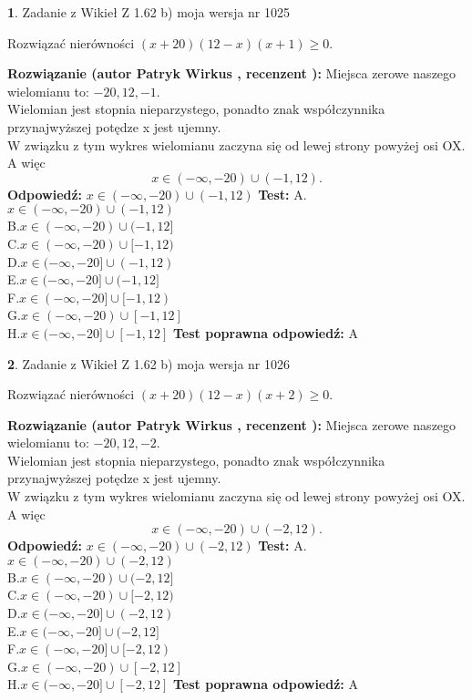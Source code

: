 \documentclass[12pt, a4paper]{article}
\theoremstyle{definition} %
\newtheorem{zad}{}
\newcommand{\zadStart}[1]{\begin{zad}#1\newline}
\newcommand{\zadStop}{\end{zad}}
\newcommand{\rozwStart}[2]{\noindent \textbf{Rozwiązanie (autor #1 , recenzent #2): }\newline}
\newcommand{\rozwStop}{\newline}
\newcommand{\odpStart}{\noindent \textbf{Odpowiedź:}\newline}
\newcommand{\odpStop}{\newline}
\newcommand{\testStart}{\noindent \textbf{Test:}\newline}
\newcommand{\testStop}{\newline}
\newcommand{\kluczStart}{\noindent \textbf{Test poprawna odpowiedź:}\newline}
\newcommand{\kluczStop}{\newline}
\begin{document}
\zadStart{Zadanie z Wikieł Z 1.62 b) moja wersja nr 1025}

Rozwiązać nierówności $(x+20)(12-x)(x+1)\ge0$.
\zadStop
\rozwStart{Patryk Wirkus}{}
Miejsca zerowe naszego wielomianu to: $-20, 12, -1$.\\
Wielomian jest stopnia nieparzystego, ponadto znak współczynnika przy\linebreak najwyższej potędze x jest ujemny.\\ W związku z tym wykres wielomianu zaczyna się od lewej strony powyżej osi OX. A więc $$x \in (-\infty,-20) \cup (-1,12).$$
\rozwStop
\odpStart
$x \in (-\infty,-20) \cup (-1,12)$
\odpStop
\testStart
A.$x \in (-\infty,-20) \cup (-1,12)$\\
B.$x \in (-\infty,-20) \cup (-1,12]$\\
C.$x \in (-\infty,-20) \cup [-1,12)$\\
D.$x \in (-\infty,-20] \cup (-1,12)$\\
E.$x \in (-\infty,-20] \cup (-1,12]$\\
F.$x \in (-\infty,-20] \cup [-1,12)$\\
G.$x \in (-\infty,-20) \cup [-1,12]$\\
H.$x \in (-\infty,-20] \cup [-1,12]$
\testStop
\kluczStart
A
\kluczStop



\zadStart{Zadanie z Wikieł Z 1.62 b) moja wersja nr 1026}

Rozwiązać nierówności $(x+20)(12-x)(x+2)\ge0$.
\zadStop
\rozwStart{Patryk Wirkus}{}
Miejsca zerowe naszego wielomianu to: $-20, 12, -2$.\\
Wielomian jest stopnia nieparzystego, ponadto znak współczynnika przy\linebreak najwyższej potędze x jest ujemny.\\ W związku z tym wykres wielomianu zaczyna się od lewej strony powyżej osi OX. A więc $$x \in (-\infty,-20) \cup (-2,12).$$
\rozwStop
\odpStart
$x \in (-\infty,-20) \cup (-2,12)$
\odpStop
\testStart
A.$x \in (-\infty,-20) \cup (-2,12)$\\
B.$x \in (-\infty,-20) \cup (-2,12]$\\
C.$x \in (-\infty,-20) \cup [-2,12)$\\
D.$x \in (-\infty,-20] \cup (-2,12)$\\
E.$x \in (-\infty,-20] \cup (-2,12]$\\
F.$x \in (-\infty,-20] \cup [-2,12)$\\
G.$x \in (-\infty,-20) \cup [-2,12]$\\
H.$x \in (-\infty,-20] \cup [-2,12]$
\testStop
\kluczStart
A
\kluczStop
\end{document}
